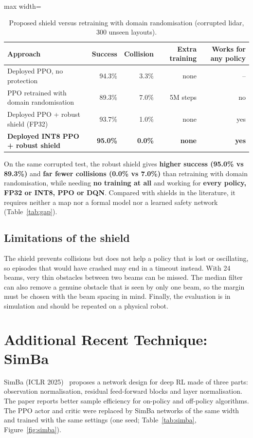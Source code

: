 \documentclass[12pt,a4paper,oneside]{report}
\begin{document}
\begin{table}[H]
\centering\small
\caption{Proposed shield versus retraining with domain randomisation (corrupted lidar, 300 unseen layouts).}
\label{tab:compare}
\begin{adjustbox}{max width=\linewidth}
\begin{tabular}{lrrrr}
\toprule
Approach & Success & Collision & Extra training & Works for any policy \\
\midrule
Deployed PPO, no protection & 94.3\% & 3.3\% & none & -- \\
PPO retrained with domain randomisation & 89.3\% & 7.0\% & 5M steps & no \\
Deployed PPO + robust shield (FP32) & 93.7\% & 1.0\% & none & yes \\
\textbf{Deployed INT8 PPO + robust shield} & \textbf{95.0\%} & \textbf{0.0\%} & \textbf{none} & \textbf{yes} \\
\bottomrule
\end{tabular}
\end{adjustbox}
\end{table}

\begin{tcolorbox}[novelty,title=\textbf{How the novelty outperforms the existing approach}]
On the same corrupted test, the robust shield gives \textbf{higher success (95.0\% vs 89.3\%)} and \textbf{far fewer
collisions (0.0\% vs 7.0\%)} than retraining with domain randomisation, while needing \textbf{no training at all} and
working for \textbf{every policy, FP32 or INT8, PPO or DQN}. Compared with shields in the literature, it requires
neither a map nor a formal model nor a learned safety network (Table~\ref{tab:gap}).
\end{tcolorbox}

\section{Limitations of the shield}
The shield prevents collisions but does not help a policy that is lost or oscillating, so episodes that would have
crashed may end in a timeout instead. With 24 beams, very thin obstacles between two beams can be missed. The
median filter can also remove a genuine obstacle that is seen by only one beam, so the margin must be chosen with
the beam spacing in mind. Finally, the evaluation is in simulation and should be repeated on a physical robot.

\chapter{Additional Recent Technique: SimBa}
\label{ch:recent}
SimBa (ICLR 2025)~\cite{simba2025} proposes a network design for deep RL made of three parts: observation
normalisation, residual feed-forward blocks and layer normalisation. The paper reports better sample efficiency for
on-policy and off-policy algorithms. The PPO actor and critic were replaced by SimBa networks of the same width and
trained with the same settings (one seed; Table~\ref{tab:simba}, Figure~\ref{fig:simba}).
\end{document}
